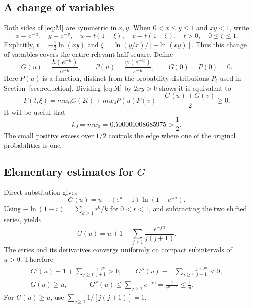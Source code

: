 \documentclass[11pt]{article}
\theoremstyle{remark}
\begin{document}
\subsection{A change of variables}
Both sides of \eqref{eq:M} are symmetric in \(x,y\).
When \(0<x\le y\le1\) and \(xy<1\), write
\[
x=e^{-u},\quad y=e^{-v},\quad
u=t(1+\xi),\quad v=t(1-\xi),\quad t>0,\quad0\le\xi\le1.
\]
Explicitly, \(t=-\tfrac12\ln(xy)\) and
\(\xi=\ln(y/x)/[-\ln(xy)]\). Thus this change of variables covers
the entire relevant half-square.
Define
\begin{equation}\label{eq:GP-def}
G(u)=\frac{h(e^{-u})}{e^{-u}},\qquad
P(u)=\frac{\psi(e^{-u})}{e^{-u}},\qquad G(0)=P(0)=0.
\end{equation}
Here \(P(u)\) is a function, distinct from the probability
distributions \(P_i\) used in Section~\ref{sec:reduction}.
Dividing \eqref{eq:M} by \(2xy>0\) shows it is equivalent to
\begin{equation}\label{eq:F}
F(t,\xi)=mw_0G(2t)+mw_4P(u)P(v)
-\frac{G(u)+G(v)}2\ge0.
\end{equation}
It will be useful that
\begin{equation}\label{eq:k0}
k_0=mw_0=0.500000008685975>\frac12.
\end{equation}
The small positive excess over \(1/2\) controls the edge where one
of the original probabilities is one.

\subsection{Elementary estimates for \texorpdfstring{\(G\)}{G}}
Direct substitution gives
\[
G(u)=u-(e^u-1)\ln(1-e^{-u}).
\]
Using \(-\ln(1-r)=\sum_{k\ge1}r^k/k\) for \(0<r<1\),
and subtracting the two shifted series, yields
\begin{equation}\label{eq:Gseries}
G(u)=u+1-\sum_{j\ge1}\frac{e^{-ju}}{j(j+1)}.
\end{equation}
The series and its derivatives converge uniformly on compact
subintervals of \(u>0\). Therefore
\begin{equation}\label{eq:Gproperties}
\begin{gathered}
G'(u)=1+\sum_{j\ge1}\frac{e^{-ju}}{j+1}>0,\qquad
G''(u)=-\sum_{j\ge1}\frac{j\,e^{-ju}}{j+1}<0,\\
G(u)\ge u,\qquad
-G''(u)\le\sum_{j\ge1}e^{-ju}
=\frac1{e^u-1}\le\frac1u.
\end{gathered}
\end{equation}
For \(G(u)\ge u\), use
\(\sum_{j\ge1}1/[j(j+1)]=1\).
\end{document}
